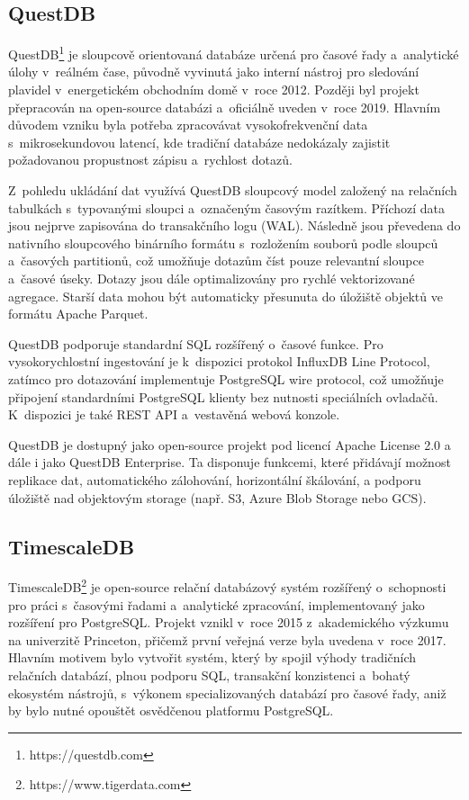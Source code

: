 \subsection{QuestDB}
QuestDB\footnote{https://questdb.com} je sloupcově orientovaná databáze určená pro časové řady a~analytické úlohy v~reálném čase, původně vyvinutá jako interní nástroj pro sledování plavidel v~energetickém obchodním domě v~roce 2012. 
Později byl projekt přepracován na open-source databázi a~oficiálně uveden v~roce 2019. 
Hlavním důvodem vzniku byla potřeba zpracovávat vysokofrekvenční data s~mikrosekundovou latencí, kde tradiční databáze nedokázaly zajistit požadovanou propustnost zápisu a~rychlost dotazů.
\cite{questdbdocs}

Z~pohledu ukládání dat využívá QuestDB sloupcový model založený na relačních tabulkách s~typovanými sloupci a~označeným časovým razítkem. 
Příchozí data jsou nejprve zapisována do transakčního logu (WAL). 
Následně jsou převedena do nativního sloupcového binárního formátu s~rozložením souborů podle sloupců a~časových partitionů, což umožňuje dotazům číst pouze relevantní sloupce a~časové úseky. 
Dotazy jsou dále optimalizovány pro rychlé vektorizované agregace. 
Starší data mohou být automaticky přesunuta do úložiště objektů ve formátu Apache Parquet.
\cite{questdbdocs}

QuestDB podporuje standardní SQL rozšířený o~časové funkce. 
Pro vysokorychlostní ingestování je k~dispozici protokol InfluxDB Line Protocol, zatímco pro dotazování implementuje PostgreSQL wire protocol, což umožňuje připojení standardními PostgreSQL klienty bez nutnosti speciálních ovladačů. 
K~dispozici je také REST API a~vestavěná webová konzole.

QuestDB je dostupný jako open-source projekt pod licencí Apache License 2.0 a dále i jako QuestDB Enterprise. Ta disponuje funkcemi, které přidávají možnost replikace dat, automatického zálohování, horizontální škálování, a podporu úložiště nad objektovým storage (např. S3, Azure Blob Storage nebo GCS).

\subsection{TimescaleDB}

TimescaleDB\footnote{https://www.tigerdata.com} je open-source relační databázový systém rozšířený o~schopnosti pro práci s~časovými řadami a~analytické zpracování, implementovaný jako rozšíření pro PostgreSQL. 
Projekt vznikl v~roce 2015 z~akademického výzkumu na univerzitě Princeton, přičemž první veřejná verze byla uvedena v~roce 2017. 
Hlavním motivem bylo vytvořit systém, který by spojil výhody tradičních relačních databází, plnou podporu SQL, transakční konzistenci a~bohatý ekosystém nástrojů, s~výkonem specializovaných databází pro časové řady, aniž by bylo nutné opouštět osvědčenou platformu PostgreSQL. 
\cite{timescaledbdocs}

